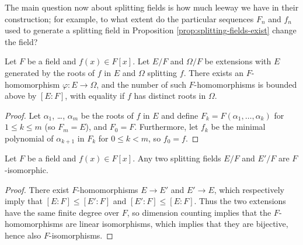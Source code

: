 \documentclass[10pt]{article}
\begin{document}
The main question now about splitting fields
is how much leeway we have in their construction;
for example, to what extent do the particular sequences $F_n$ and $f_n$
used to generate a splitting field in
Proposition \ref{prop:splitting-fields-exist} change the field?

\begin{lemma}
    \label{lem:homomorphisms-into-splitting-field}
    Let $F$ be a field and $f(x)\in F[x]$.
    Let $E/F$ and $\Omega/F$ be extensions with
    $E$ generated by the roots of $f$ in $E$
    and $\Omega$ splitting $f$.
    There exists an $F$-homomorphism $\varphi\colon E\to\Omega$,
    and the number of such $F$-homomorphisms is bounded above by $[E : F]$,
    with equality if $f$ has distinct roots in $\Omega$.
\end{lemma}

\begin{proof}
    Let $\alpha_1$, \dots, $\alpha_m$ be the roots of $f$ in $E$
    and define $F_k = F(\alpha_1,\dots,\alpha_k)$
    for $1\le k\le m$ (so $F_m = E$), and $F_0 = F$.
    Furthermore, let $f_k$ be the minimal polynomial of $\alpha_{k+1}$
    in $F_k$ for $0\le k < m$, so $f_0 = f$.
\end{proof}

\begin{corollary}
    \label{coro:splitting-fields-isomorphic}
    Let $F$ be a field and $f(x)\in F[x]$.
    Any two splitting fields $E/F$ and $E'/F$ are $F$-isomorphic.
\end{corollary}

\begin{proof}
    There exist $F$-homomorphisms $E\to E'$ and $E'\to E$,
    which respectively imply that $[E : F]\le[E' : F]$
    and $[E' : F]\le [E : F]$. Thus the two extensions
    have the same finite degree over $F$,
    so dimension counting implies that
    the $F$-homomorphisms are linear isomorphisms,
    which implies that they are bijective, hence also $F$-isomorphisms.
\end{proof}
\end{document}
